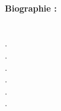







\paragraph{Biographie :} \dotfill \\
.\dotfill \\
.\dotfill \\
.\dotfill \\
.\dotfill \\
.\dotfill \\
.\dotfill \\



\vskip 25pt






